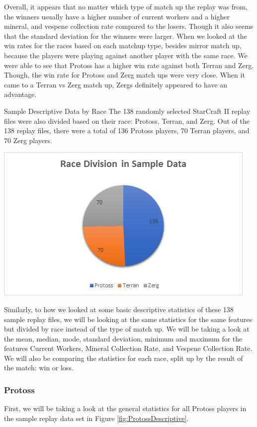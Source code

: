 \documentclass[a4paper,12pt]{report}
\begin{document}
Overall, it appears that no matter which type of match up the replay was from, the winners usually have a higher number of current workers and a higher mineral, and vespene collection rate compared to the losers. Though it also seems that the standard deviation for the winners were larger. When we looked at the win rates for the races based on each matchup type, besides mirror match up, because the players were playing against another player with the same race. We were able to see that Protoss has a higher win rate against both Terran and Zerg. Though, the win rate for Protoss and Zerg match ups were very close. When it came to a Terran vs Zerg match up, Zergs definitely appeared to have an advantage. 

Sample Descriptive Data by Race
The 138 randomly selected StarCraft II replay files were also divided based on their race: Protoss, Terran, and Zerg. Out of the 138 replay files, there were a total of 136 Protoss players, 70 Terran players, and 70 Zerg players. 

\begin{center}
    \captionsetup{type=figure}
    \includegraphics[width=.9\linewidth]{media/RaceDivision.png}
\end{center}

Similarly, to how we looked at some basic descriptive statistics of these 138 sample replay files, we will be looking at the same statistics for the same features but divided by race instead of the type of match up. We will be taking a look at the mean, median, mode, standard deviation, minimum and maximum for the features Current Workers, Mineral Collection Rate, and Vespene Collection Rate. We will also be comparing the statistics for each race, split up by the result of the match: win or loss. 

\subsubsection{Protoss}
First, we will be taking a look at the general statistics for all Protoss players in the sample replay data set in Figure \ref{fig:ProtossDescriptive}. 
\end{document}
